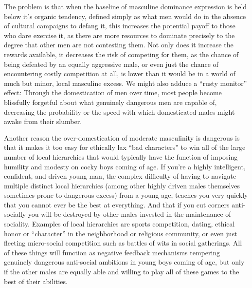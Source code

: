\documentclass[a4paper,12pt,margin=.5in]{article}
\begin{document}
The problem is that when the baseline of masculine dominance expression
is held below it's organic tendency, defined simply as what men would do
in the absence of cultural campaigns to defang it, this increases the
potential payoff to those who dare exercise it, as there are more
resources to dominate precisely to the degree that other men are not
contesting them. Not only does it increase the rewards available, it
decreases the risk of competing for them, as the chance of being
defeated by an equally aggressive male, or even just the chance of
encountering costly competition at all, is lower than it would be in a
world of much but minor, local masculine excess. We might also adduce a
``rusty monitor'' effect: Through the domestication of men over time,
most people become blissfully forgetful about what genuinely dangerous
men are capable of, decreasing the probability or the speed with which
domesticated males might awake from their slumber.

Another reason the over-domestication of moderate masculinity is
dangerous is that it makes it too easy for ethically lax ``bad
characters'' to win all of the large number of local hierarchies that
would typically have the function of imposing humility and modesty on
cocky boys coming of age. If you're a highly intelligent, confident, and
driven young man, the complex difficulty of having to navigate multiple
distinct local hierarchies (among other highly driven males themselves
sometimes prone to dangerous excess) from a young age, teaches you very
quickly that you cannot ever be the best at everything. And that if you
cut corners anti-socially you will be destroyed by other males invested
in the maintenance of sociality. Examples of local hierarchies are
sports competition, dating, ethical honor or ``character'' in the
neighborhood or religious community, or even just fleeting micro-social
competition such as battles of wits in social gatherings. All of these
things will function as negative feedback mechanisms tempering genuinely
dangerous anti-social ambitions in young boys coming of age, but only if
the other males are equally able and willing to play all of these games
to the best of their abilities.
\end{document}
